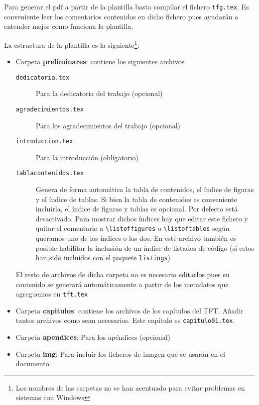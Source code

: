 Para generar el pdf a partir de la plantilla basta compilar el fichero \texttt{tfg.tex}. Es conveniente leer los comentarios contenidos en dicho fichero pues ayudarán a entender mejor como funciona la plantilla. 

La estructura de la plantilla es la siguiente\footnote{Los nombres de las carpetas no se han acentuado para evitar problemas en sistemas con Windows}: 
\begin{itemize}
  \item Carpeta \textbf{preliminares}: contiene los siguientes archivos
    \begin{description}
      \item[\texttt{dedicatoria.tex}] Para la dedicatoria del trabajo (opcional)
      \item[\texttt{agradecimientos.tex}] Para los agradecimientos del trabajo (opcional)
      \item[\texttt{introduccion.tex}] Para la introducción (obligatorio)
      \item[\texttt{tablacontenidos.tex}] Genera de forma automática la tabla de contenidos, el índice de figuras y el índice de tablas. Si bien la tabla de contenidos es conveniente incluirla, el índice de figuras y tablas es opcional. Por defecto está desactivado. Para mostrar dichos índices hay que editar este fichero y quitar el comentario a \verb+\listoffigures+ o \verb+\listoftables+ según queramos uno de los índices o los dos. En este archivo también es posible habilitar la inclusión de un índice de listados de código (si estos han sido incluidos con el paquete \texttt{listings})
  \end{description}
  El resto de archivos de dicha carpeta no es necesario editarlos pues su contenido se generará automáticamente a partir de los metadatos que agreguemos en \texttt{tft.tex}

  \item Carpeta \textbf{capitulos}: contiene los archivos de los capítulos del TFT. Añadir tantos archivos como sean necesarios. Este capítulo es \texttt{capitulo01.tex}.

  \item Carpeta \textbf{apendices}: Para los apéndices (opcional)
  \item Carpeta \textbf{img}: Para incluir los ficheros de imagen que se usarán en el documento.
    

\end{itemize}
